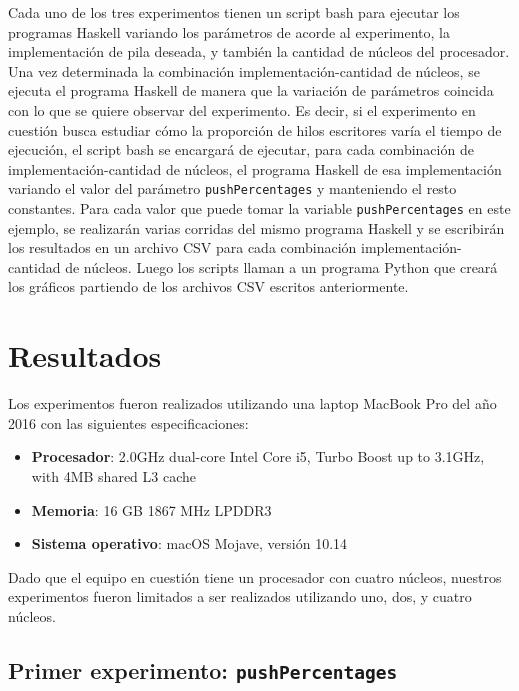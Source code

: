 
Cada uno de los tres experimentos tienen un script bash para ejecutar los programas Haskell variando los parámetros de acorde al experimento, la implementación de pila deseada, y también la cantidad de núcleos del procesador. Una vez determinada la combinación implementación-cantidad de núcleos, se ejecuta el programa Haskell de manera que la variación de parámetros coincida con lo que se quiere observar del experimento. Es decir, si el experimento en cuestión busca estudiar cómo la proporción de hilos escritores varía el tiempo de ejecución, el script bash se encargará de ejecutar, para cada combinación de implementación-cantidad de núcleos, el programa Haskell de esa implementación variando el valor del parámetro \texttt{pushPercentages} y manteniendo el resto constantes. Para cada valor que puede tomar la variable \texttt{pushPercentages} en este ejemplo, se realizarán varias corridas del mismo programa Haskell y se escribirán los resultados en un archivo CSV para cada combinación implementación-cantidad de núcleos. Luego los scripts llaman a un programa Python que creará los gráficos partiendo de los archivos CSV escritos anteriormente.

\section{Resultados}

Los experimentos fueron realizados utilizando una laptop MacBook Pro del año 2016 con las siguientes especificaciones:

\begin{itemize}
    \item \textbf{Procesador}: 2.0GHz dual-core Intel Core i5, Turbo Boost up to 3.1GHz, with 4MB shared L3 cache
    \item \textbf{Memoria}: 16 GB 1867 MHz LPDDR3
    \item \textbf{Sistema operativo}: macOS Mojave, versión 10.14
\end{itemize}

Dado que el equipo en cuestión tiene un procesador con cuatro núcleos, nuestros experimentos fueron limitados a ser realizados utilizando uno, dos, y cuatro núcleos.

\subsection{Primer experimento: \texttt{pushPercentages}}

